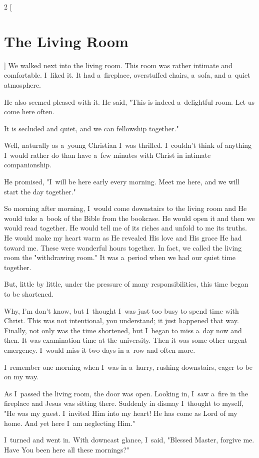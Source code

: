 \documentclass[a4paper,12pt]{article}
\begin{document}
\begin{multicols}{2}
    [
\section*{The Living Room}
    ]
We walked next into the living room. This room was rather intimate and comfortable. I~liked it. It had a~fireplace, overstuffed chairs, a~sofa, and a~quiet atmosphere. 

He also seemed pleased with it. He said, "This is indeed a~delightful room. Let us come here often. 

It is secluded and quiet, and we can fellowship together." 

Well, naturally as a~young Christian I~was thrilled. I~couldn't think of anything I~would rather do than have a~few minutes with Christ in intimate companionship. 

He promised, "I~will be here early every morning. Meet me here, and we will start the day together." 

So morning after morning, I~would come downstairs to the living room and He would take a~book of the Bible from the bookcase. He would open it and then we would read together. He would tell me of its riches and unfold to me its truths. He would make my heart warm as He revealed His love and His grace He had toward me. These were wonderful hours together. In fact, we called the living room the "withdrawing room." It was a~period when we had our quiet time together. 

But, little by little, under the pressure of many responsibilities, this time began to be shortened. 

Why, I'm don't know, but I~thought I~was just too busy to spend time with Christ. This was not intentional, you understand; it just happened that way. Finally, not only was the time shortened, but I~began to miss a~day now and then. It was examination time at the university. Then it was some other urgent emergency. I~would miss it two days in a~row and often more. 


I~remember one morning when I~was in a~hurry, rushing downstairs, eager to be on my way. 

As I~passed the living room, the door was open. Looking in, I~saw a~fire in the fireplace and Jesus was sitting there. Suddenly in dismay I~thought to myself, "He was my guest. I~invited Him into my heart! He has come as Lord of my home. And yet here I~am neglecting Him." 

I~turned and went in. With downcast glance, I~said, "Blessed Master, forgive me. Have You been here all these mornings?" 


\end{multicols}
\end{document}
